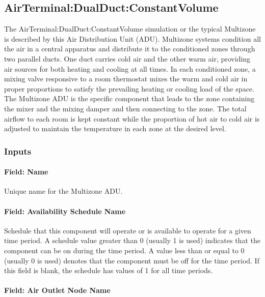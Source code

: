 \subsection{AirTerminal:DualDuct:ConstantVolume}\label{airterminaldualductconstantvolume}

The AirTerminal:DualDuct:ConstantVolume simulation or the typical Multizone is described by this Air Distribution Unit (ADU). Multizone systems condition all the air in a central apparatus and distribute it to the conditioned zones through two parallel ducts. One duct carries cold air and the other warm air, providing air sources for both heating and cooling at all times. In each conditioned zone, a mixing valve responsive to a room thermostat mixes the warm and cold air in proper proportions to satisfy the prevailing heating or cooling load of the space. The Multizone ADU is the specific component that leads to the zone containing the mixer and the mixing damper and then connecting to the zone. The total airflow to each room is kept constant while the proportion of hot air to cold air is adjusted to maintain the temperature in each zone at the desired level.

\subsubsection{Inputs}\label{inputs-14-000}

\paragraph{Field: Name}\label{field-name-14}

Unique name for the Multizone ADU.

\paragraph{Field: Availability Schedule Name}\label{field-availability-schedule-name-11}

Schedule that this component will operate or is available to operate for a given time period. A schedule value greater than 0 (usually 1 is used) indicates that the component can be on during the time period. A value less than or equal to 0 (usually 0 is used) denotes that the component must be off for the time period. If this field is blank, the schedule has values of 1 for all time periods.

\paragraph{Field: Air Outlet Node Name}\label{field-air-outlet-node-name-7}

